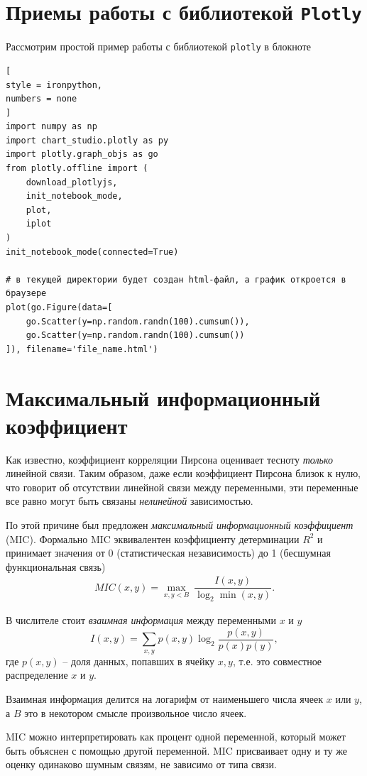 \documentclass[%
	11pt,
	a4paper,
	utf8,
		]{article}
\begin{document}
\section{Приемы работы с библиотекой \texttt{Plotly}}

Рассмотрим простой пример работы с библиотекой \texttt{plotly} в блокноте
\begin{lstlisting}[
style = ironpython,
numbers = none
]
import numpy as np
import chart_studio.plotly as py
import plotly.graph_objs as go
from plotly.offline import (
    download_plotlyjs,
    init_notebook_mode,
    plot,
    iplot
)
init_notebook_mode(connected=True)

# в текущей директории будет создан html-файл, а график откроется в браузере
plot(go.Figure(data=[
    go.Scatter(y=np.random.randn(100).cumsum()),
    go.Scatter(y=np.random.randn(100).cumsum())
]), filename='file_name.html')
\end{lstlisting}

\section{Максимальный информационный коэффициент}

Как известно, коэффициент корреляции Пирсона оценивает тесноту \emph{только} линейной связи. Таким образом, даже если коэффициент Пирсона близок к нулю, что говорит об отсутствии линейной связи между переменными, эти переменные все равно могут быть связаны \emph{нелинейной} зависимостью.

По этой причине был предложен \emph{максимальный информационный коэффициент} (MIC). Формально MIC эквивалентен коэффициенту детерминации $ R^2 $ и принимает значения от 0 (статистическая независимость) до 1 (бесшумная функциональная связь)
\begin{align*}
	MIC(x, y) = \max\limits_{x,y < B}\ \dfrac{I(x, y)}{\log_2 \min (x, y)}.
\end{align*}

В числителе стоит \emph{взаимная информация} между переменными $ x $ и $ y $
$$
    I(x, y) = \sum_{x,y}p(x,y) \log_2 \dfrac{p(x,y)}{p(x)p(y)},
$$
где $ p(x,y) $ -- доля данных, попавших в ячейку $ x, y $, т.е. это совместное распределение $ x $ и $ y $.

Взаимная информация делится на логарифм от наименьшего числа ячеек $ x $ или $ y $, а $ B $ это в некотором смысле произвольное число ячеек.

MIC можно интерпретировать как процент одной переменной, который может быть объяснен с помощью другой переменной. MIC присваивает одну и ту же оценку одинаково шумным связям, не зависимо от типа связи.
\end{document}
